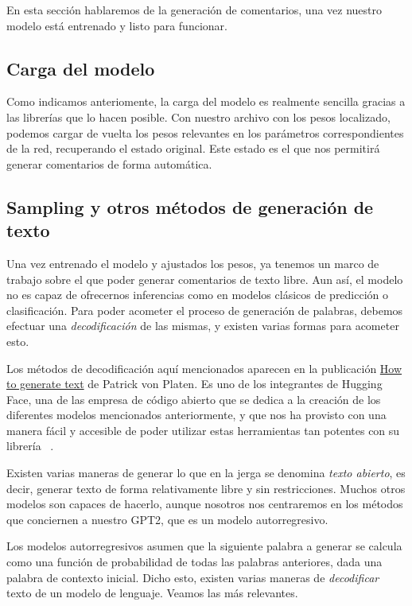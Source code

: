 En esta sección hablaremos de la generación de comentarios, una vez nuestro modelo está entrenado y listo para funcionar. 

\subsection{Carga del modelo}
Como indicamos anteriomente, la carga del modelo es realmente sencilla gracias a las librerías que lo hacen posible. Con nuestro archivo con los pesos localizado, podemos cargar de vuelta los pesos relevantes en los parámetros correspondientes de la red, recuperando el estado original. Este estado es el que nos permitirá generar comentarios de forma automática.

\subsection{Sampling y otros métodos de generación de texto}
Una vez entrenado el modelo y ajustados los pesos, ya tenemos un marco de trabajo sobre el que poder generar comentarios de texto libre. Aun así, el modelo no es capaz de ofrecernos inferencias como en modelos clásicos de predicción o clasificación. Para poder acometer el proceso de generación de palabras, debemos efectuar una \textit{decodificación} de las mismas, y existen varias formas para acometer esto. 

Los métodos de decodificación aquí mencionados aparecen en la publicación \href{https://huggingface.co/blog/how-to-generate}{How to generate text} de Patrick von Platen. Es uno de los integrantes de Hugging Face, una de las empresa de código abierto que se dedica a la creación de los diferentes modelos mencionados anteriormente, y que nos ha provisto con una manera fácil y accesible de poder utilizar estas herramientas tan potentes con su librería ~\cite{WolfEtal2020Transformers}.

Existen varias maneras de generar lo que en la jerga se denomina \textit{texto abierto}, es decir, generar texto de forma relativamente libre y sin restricciones. Muchos otros modelos son capaces de hacerlo, aunque nosotros nos centraremos en los métodos que conciernen a nuestro GPT2, que es un modelo autorregresivo.

Los modelos autorregresivos asumen que la siguiente palabra a generar se calcula como una función de probabilidad de todas las palabras anteriores, dada una palabra de contexto inicial. Dicho esto, existen varias maneras de \textit{decodificar} texto de un modelo de lenguaje. Veamos las más relevantes.

